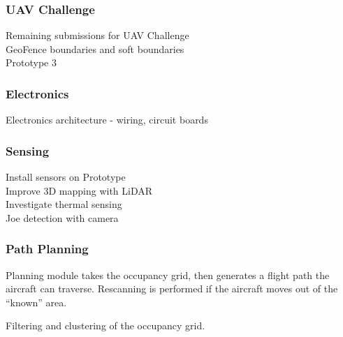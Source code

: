 \subsubsection*{UAV Challenge}
\label{sec:futurework}
Remaining submissions for UAV Challenge\\

GeoFence boundaries and soft boundaries\\

Prototype 3\\

\subsubsection*{Electronics}
Electronics architecture - wiring, circuit boards\\

\subsubsection*{Sensing}
Install sensors on Prototype\\

Improve 3D mapping with LiDAR\\

Investigate thermal sensing\\

Joe detection with camera\\

\subsubsection*{Path Planning}
Planning module takes the occupancy grid, then generates a flight path the aircraft can traverse. Rescanning is performed if the aircraft moves out of the ``known'' area.

Filtering and clustering of the occupancy grid.